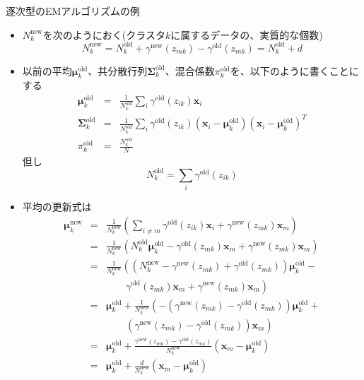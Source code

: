\documentclass[dvipdfmx,notheorems,t]{beamer}
\begin{document}
\begin{frame}{逐次型のEMアルゴリズムの例}
\begin{itemize}
\begin{itemize}
		\item $N_k^\mathrm{new}$を次のようにおく(クラスタ$k$に属するデータの、実質的な個数)
		\begin{equation}
			N_k^\mathrm{new} = N_k^\mathrm{old} + \gamma^\mathrm{new}(z_{mk}) - \gamma^\mathrm{old}(z_{mk}) = N_k^\mathrm{old} + d
		\end{equation}
		
		\item 以前の平均$\bm{\mu}_k^\mathrm{old}$、共分散行列$\bm{\Sigma}_k^\mathrm{old}$、混合係数$\pi_k^\mathrm{old}$を、以下のように書くことにする
		\begin{eqnarray}
			\bm{\mu}_k^\mathrm{old} &=& \frac{1}{N_k^\mathrm{old}} \sum_i \gamma^\mathrm{old}(z_{ik}) \bm{x}_i \\
			\bm{\Sigma}_k^\mathrm{old} &=& \frac{1}{N_k^\mathrm{old}} \sum_i \gamma^\mathrm{old}(z_{ik}) (\bm{x}_i - \bm{\mu}_k^\mathrm{old}) (\bm{x}_i - \bm{\mu}_k^\mathrm{old})^T \\
			\pi_k^\mathrm{old} &=& \frac{N_k^\mathrm{old}}{N}
		\end{eqnarray}
		但し
		\begin{equation}
			N_k^\mathrm{old} = \sum_i \gamma^\mathrm{old}(z_{ik})
		\end{equation}
		
		\item 平均の更新式は
		\begin{eqnarray}
			\bm{\mu}_k^\mathrm{new} &=& \frac{1}{N_k^\mathrm{new}} \left( \sum_{i \neq m} \gamma^\mathrm{old}(z_{ik}) \bm{x}_i + \gamma^\mathrm{new}(z_{mk}) \bm{x}_m \right) \\
			&=& \frac{1}{N_k^\mathrm{new}} \left( N_k^\mathrm{old} \bm{\mu}_k^\mathrm{old} - \gamma^\mathrm{old}(z_{mk}) \bm{x}_m + \gamma^\mathrm{new}(z_{mk}) \bm{x}_m \right) \nonumber \\
			&=& \frac{1}{N_k^\mathrm{new}} \left( \left( N_k^\mathrm{new} - \gamma^\mathrm{new}(z_{mk}) + \gamma^\mathrm{old}(z_{mk}) \right) \bm{\mu}_k^\mathrm{old} - \right. \nonumber \\
			&& \qquad \left. \gamma^\mathrm{old}(z_{mk}) \bm{x}_m + \gamma^\mathrm{new}(z_{mk}) \bm{x}_m \right) \nonumber \\
			&=& \bm{\mu}_k^\mathrm{old} + \frac{1}{N_k^\mathrm{new}} \left( -(\gamma^\mathrm{new}(z_{mk}) - \gamma^\mathrm{old}(z_{mk})) \bm{\mu}_k^\mathrm{old} + \right. \nonumber \\
			&& \qquad \left. (\gamma^\mathrm{new}(z_{mk}) - \gamma^\mathrm{old}(z_{mk})) \bm{x}_m \right) \nonumber \\
			&=& \bm{\mu}_k^\mathrm{old} + \frac{\gamma^\mathrm{new}(z_{mk}) - \gamma^\mathrm{old}(z_{mk})}{N_k^\mathrm{new}} \left( \bm{x}_m - \bm{\mu}_k^\mathrm{old} \right) \\
			&=& \bm{\mu}_k^\mathrm{old} + \frac{d}{N_k^\mathrm{new}} \left( \bm{x}_m - \bm{\mu}_k^\mathrm{old} \right)
		\end{eqnarray}
		

\end{itemize}
\end{itemize}
\end{frame}
\end{document}
